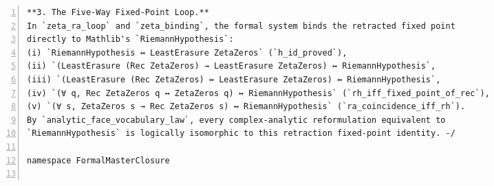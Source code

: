 \documentclass[10pt]{article}
\newcommand{\leansize}{\fontsize{5.5pt}{6.75pt}\selectfont}
\begin{document}
\begin{multicols}{2}
\begin{Verbatim}[numbers=left,firstnumber=1,numbersep=3pt,xleftmargin=2.6em,breaklines=true,breakanywhere=true,breakautoindent=false,breakindent=1.4em,breaksymbolleft={},breakanywheresymbolpre={},fontsize=\leansize]
**3. The Five-Way Fixed-Point Loop.**
In `zeta_ra_loop` and `zeta_binding`, the formal system binds the retracted fixed point
directly to Mathlib's `RiemannHypothesis`:
(i) `RiemannHypothesis ↔ LeastErasure ZetaZeros` (`h_id_proved`),
(ii) `(LeastErasure (Rec ZetaZeros) → LeastErasure ZetaZeros) ↔ RiemannHypothesis`,
(iii) `(LeastErasure (Rec ZetaZeros) ↔ LeastErasure ZetaZeros) ↔ RiemannHypothesis`,
(iv) `(∀ q, Rec ZetaZeros q ↔ ZetaZeros q) ↔ RiemannHypothesis` (`rh_iff_fixed_point_of_rec`),
(v) `(∀ s, ZetaZeros s → Rec ZetaZeros s) ↔ RiemannHypothesis` (`ra_coincidence_iff_rh`).
By `analytic_face_vocabulary_law`, every complex-analytic reformulation equivalent to
`RiemannHypothesis` is logically isomorphic to this retraction fixed-point identity. -/

namespace FormalMasterClosure


\end{Verbatim}
\end{multicols}
\end{document}
